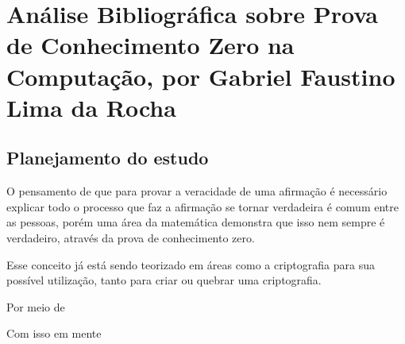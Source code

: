 \chapter{Análise Bibliográfica sobre Prova de Conhecimento Zero na Computação, por Gabriel Faustino Lima da Rocha}
\section{Planejamento do estudo}
O pensamento de que para provar a veracidade de uma afirmação é necessário explicar todo o processo que faz a afirmação se tornar verdadeira é comum entre as pessoas, porém uma área da matemática demonstra que isso nem sempre é verdadeiro, através da prova de conhecimento zero.

Esse conceito já está sendo teorizado em áreas como a criptografia para sua possível utilização, tanto para criar ou quebrar uma criptografia.

Por meio de

Com isso em mente